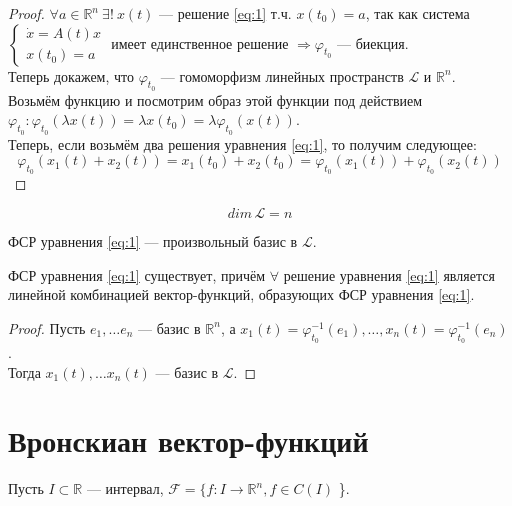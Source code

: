 \documentclass[11pt]{article}
\begin{document}
\begin{proof}
    $\forall a\in \mathbb{R}^n \ \exists! \  x(t)$ --- решение \eqref{eq:1} т.ч. $x(t_0)=a$, так как система
    $ \begin{cases}
        \dot{x} = A(t)x\\
        x(t_0)=a
    \end{cases} $
    имеет единственное решение $\Rightarrow \varphi_{t_0}$ --- биекция. \\
    Теперь докажем, что $\varphi_{t_0}$ --- гомоморфизм линейных пространств $\mathcal{L}$ и $\mathbb{R}^n$. 
    Возьмём функцию и посмотрим образ этой функции под действием $\varphi_{t_0}: \varphi_{t_0} (\lambda x(t)) = \lambda x(t_0) = \lambda \varphi_{t_0} (x(t)) $. \\ 
    Теперь, если возьмём два решения уравнения \eqref{eq:1}, то получим следующее:
    \[ \varphi_{t_0} (x_1(t)+x_2(t)) = x_1(t_0) + x_2(t_0) = \varphi_{t_0} (x_1(t)) + \varphi_{t_0}(x_2(t)) \] 
\end{proof}

\begin{consequence}
    \[ dim\, \mathcal{L} = n \] 
\end{consequence}

\begin{definition}
    ФСР уравнения \eqref{eq:1} --- произвольный базис в $\mathcal{L}$. 
\end{definition}

\begin{consequence}
    ФСР уравнения \eqref{eq:1} существует, причём $\forall$ решение уравнения \eqref{eq:1} является линейной комбинацией вектор-функций, образующих ФСР уравнения \eqref{eq:1}. 
\end{consequence}

\begin{proof}
    Пусть $e_1, \ldots e_n$ --- базис в $\mathbb{R}^n$, а $ x_1(t) = \varphi_{t_0}^{-1}(e_1), \ldots, x_n(t) = \varphi_{t_0}^{-1} (e_n) $.\\
    Тогда $x_1(t), \ldots x_n(t)$ --- базис в $\mathcal{L}$. 
\end{proof}


\section{Вронскиан вектор-функций}

Пусть $I\subset \mathbb{R}$ --- интервал, $\mathcal{F} = \{f: I\to \mathbb{R}^n , f\in C(I)$ \}.
\end{document}
